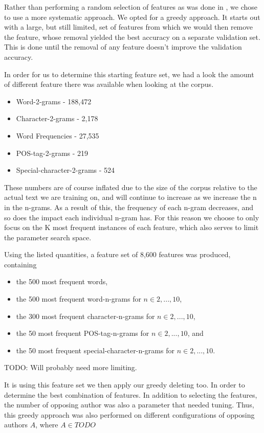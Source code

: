 Rather than performing a random selection of features as was done in \cite{US},
we chose to use a more systematic approach. We opted for a greedy approach. It
starts out with a large, but still limited, set of features from which we would
then remove the feature, whose removal yielded the best accuracy on a separate
validation set. This is done until the removal of any feature doesn't improve
the validation accuracy.

In order for us to determine this starting feature set, we had a look the
amount of different feature there was available when looking at the corpus.

\begin{itemize}
    \item Word-2-grams - 188,472
    \item Character-2-grams - 2,178
    \item Word Frequencies - 27,535
    \item \gls{POS}-tag-2-grams - 219
    \item Special-character-2-grams - 524
\end{itemize}

These numbers are of course inflated due to the size of the corpus relative
to the actual text we are training on, and will continue to increase as we
increase the n in the n-grams. As a result of this, the frequency of each n-gram
decreases, and so does the impact each individual n-gram has. For this reason
we choose to only focus on the K most frequent instances of each feature, which
also serves to limit the parameter search space.

Using the listed quantities, a feature set of 8,600 features was produced,
containing

\begin{itemize}
    \item the 500 most frequent words,
    \item the 500 most frequent word-n-grams for $n \in {2,...,10}$,
    \item the 300 most frequent character-n-grams for $n \in {2,...,10}$,
    \item the 50 most frequent \gls{POS}-tag-n-grams for $n \in {2,...,10}$, and
    \item the 50 most frequent special-character-n-grams for $n \in {2,...,10}$.
\end{itemize}
TODO: Will probably need more limiting.

It is using this feature set we then apply our greedy deleting too. In order
to determine the best combination of features. In addition to selecting the
features, the number of opposing author was also a parameter that needed tuning.
Thus, this greedy approach was also performed on different configurations of
opposing authors $A$, where $A \in TODO$
